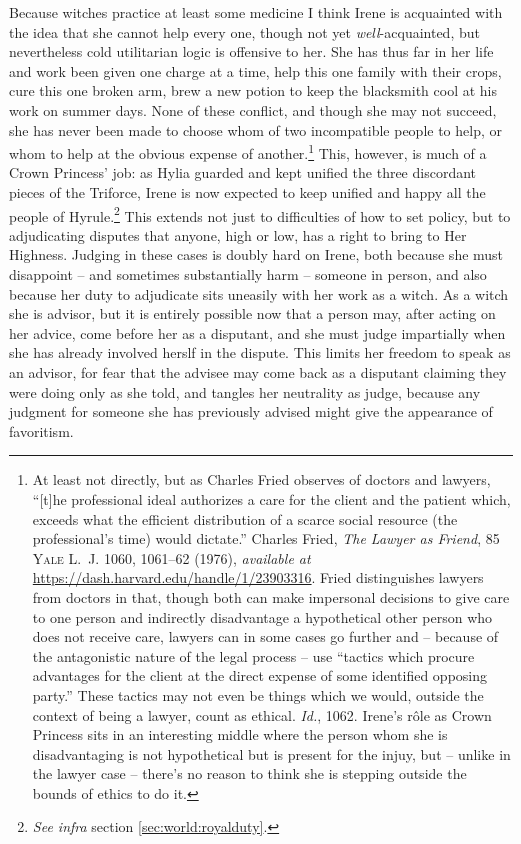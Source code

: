     Because witches practice at least some medicine I think Irene is acquainted with the idea that she cannot help every one, though not yet \emph{well}-acquainted, but nevertheless cold utilitarian logic is offensive to her. She has thus far in her life and work been given one charge at a time, help this one family with their crops, cure this one broken arm, brew a new potion to keep the blacksmith cool at his work on summer days. None of these conflict, and though she may not succeed, she has never been made to choose whom of two incompatible people to help, or whom to help at the obvious expense of another.\footnote{%
      At least not directly, but as Charles Fried observes of doctors and lawyers, ``[t]he professional ideal authorizes a care for the client and the patient which, exceeds what the efficient distribution of a scarce social resource (the professional's time) would dictate.'' Charles Fried, \textit{The Lawyer as Friend}, \textsc{85 Yale L.~J.} 1060, 1061--62 (1976), \textit{available at} \url{https://dash.harvard.edu/handle/1/23903316}. Fried distinguishes lawyers from doctors in that, though both can make impersonal decisions to give care to one person and indirectly disadvantage a hypothetical other person who does not receive care, lawyers can in some cases go further and -- because of the antagonistic nature of the legal process -- use ``tactics which procure advantages for the client at the direct expense of some identified opposing party.'' These tactics may not even be things which we would, outside the context of being a lawyer, count as ethical. \textit{Id.}, 1062.  Irene's r\^ole as Crown Princess sits in an interesting middle where the person whom she is disadvantaging is not hypothetical but is present for the injuy, but -- unlike in the lawyer case -- there's no reason to think she is stepping outside the bounds of ethics to do it.} 
    This, however, is much of a Crown Princess' job: as Hylia guarded and kept unified the three discordant pieces of the Triforce, Irene is now expected to keep unified and happy all the people of Hyrule.\footnote{\textit{See infra} section \ref{sec:world:royalduty}.} This extends not just to difficulties of how to set policy, but to adjudicating disputes that anyone, high or low, has a right to bring to Her Highness. Judging in these cases is doubly hard on Irene, both because she must disappoint -- and sometimes substantially harm -- someone in person, and also because her duty to adjudicate sits uneasily with her work as a witch. As a witch she is advisor, but it is entirely possible now that a person may, after acting on her advice, come before her as a disputant, and she must judge impartially when she has already involved herslf in the dispute. This limits her freedom to speak as an advisor, for fear that the advisee may come back as a disputant claiming they were doing only as she told, and tangles her neutrality as judge, because any judgment for someone she has previously advised might give the appearance of favoritism. 
  
